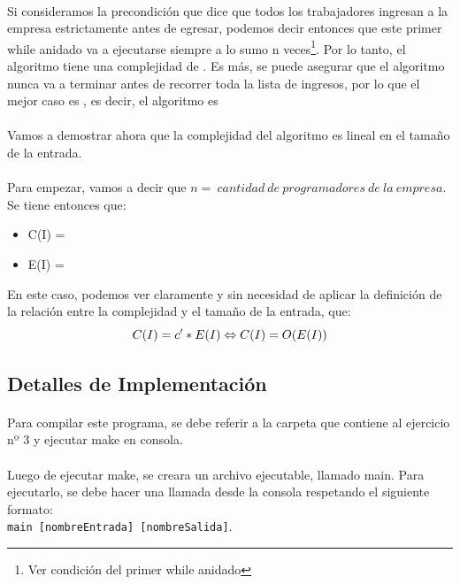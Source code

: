 \paragraph{}
Si consideramos la precondición que dice que todos los trabajadores ingresan a la empresa estrictamente antes de egresar, podemos decir entonces que este primer while anidado va a ejecutarse siempre a lo sumo n veces\footnote{Ver condición del primer while anidado}. Por lo tanto, el algoritmo tiene una complejidad de . Es más, se puede asegurar que el algoritmo nunca va a terminar antes de recorrer toda la lista de ingresos, por lo que el mejor caso es , es decir, el algoritmo es 

\paragraph{}
Vamos a demostrar ahora que la complejidad del algoritmo es lineal en el tamaño de la entrada.

\paragraph{}
Para empezar, vamos a decir que $n =\ cantidad\ de\ programadores\ de\ la\ empresa$. Se tiene entonces que:
\begin{itemize}
	\item C(I) = 
	\item E(I) = 
\end{itemize}

En este caso, podemos ver claramente y sin necesidad de aplicar la definición de la relación entre la complejidad y el tamaño de la entrada, que:
\begin{equation}
	C(I) = c' * E(I) \Leftrightarrow C(I) = O(E(I))
\end{equation}


\subsection{Detalles de Implementación}

\paragraph{}
Para compilar este programa, se debe referir a la carpeta que contiene al ejercicio nº 3 y ejecutar make en consola.

\paragraph{}
Luego de ejecutar make, se creara un archivo ejecutable, llamado main. Para ejecutarlo, se debe hacer una llamada desde la consola respetando el siguiente formato:\\
\texttt{main [nombreEntrada] [nombreSalida]}.


